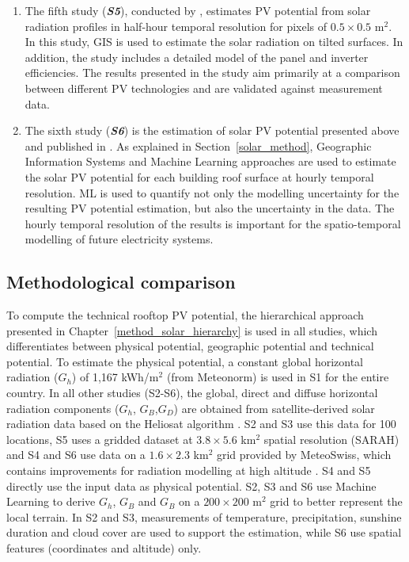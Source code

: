 \begin{enumerate}
\item The fifth study (\textbf{\textit{S5}}), conducted by \citet{buffat_scalable_2018}, estimates PV potential from solar radiation profiles in half-hour temporal resolution for pixels of $0.5 \times 0.5$ m$^2$. In this study, GIS is used to estimate the solar radiation on tilted surfaces. In addition, the study includes a detailed model of the panel and inverter efficiencies. The results presented in the study aim primarily at a comparison between different PV technologies and are validated against measurement data.
\item The sixth study (\textbf{\textit{S6}}) is the estimation of solar PV potential presented above and published in \cite{walch_big_2020}. As explained in Section~\ref{solar_method}, Geographic Information Systems and Machine Learning approaches are used to estimate the solar PV potential for each building roof surface at hourly temporal resolution.
ML is used to quantify not only the modelling uncertainty for the resulting PV potential estimation, but also the uncertainty in the data. The hourly temporal resolution of the results is important for the spatio-temporal modelling of future electricity systems.   

\end{enumerate}

\subsection{Methodological comparison}

To compute the technical rooftop PV potential, the hierarchical approach presented in Chapter~\ref{method_solar_hierarchy} is used in all studies, which differentiates between physical potential, geographic potential and technical potential.
%
To estimate the physical potential, a constant global horizontal radiation ($G_h$) of 1,167 kWh/m$^2$ (from Meteonorm) is used in S1 for the entire country. In all other studies (S2-S6), the global, direct and diffuse horizontal radiation components ($G_h$, $G_B$,$G_D$) are obtained from satellite-derived solar radiation data based on the Heliosat algorithm \cite{rigollier_method_2004}. S2 and S3 use this data for 100 locations, S5 uses a gridded dataset at $3.8 \times 5.6$ km$^2$ spatial resolution (SARAH) and S4 and S6 use data on a $1.6 \times 2.3$ km$^2$ grid provided by MeteoSwiss, which contains improvements for radiation modelling at high altitude \cite{stockli_heliomont_2017}. S4 and S5 directly use the input data as physical potential. S2, S3 and S6 use Machine Learning to derive $G_h$, $G_B$ and $G_B$ on a $200 \times 200$ m$^2$ grid to better represent the local terrain. In S2 and S3, measurements of temperature, precipitation, sunshine duration and cloud cover are used to support the estimation, while S6 use spatial features (coordinates and altitude) only. 

